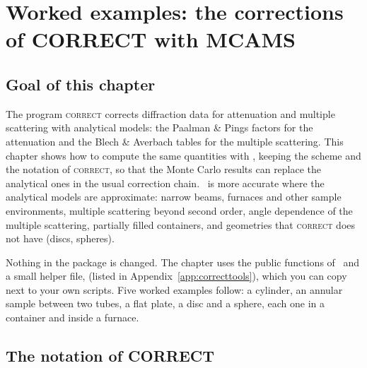 \chapter{Worked examples: the corrections of CORRECT with MCAMS}
\label{ch:correct}

\section{Goal of this chapter}

The program \textsc{correct} corrects diffraction data for attenuation and multiple scattering with analytical models: the
Paalman \& Pings factors for the attenuation and the Blech \& Averbach tables for the multiple scattering. This chapter shows how to
compute the same quantities with \mcams, keeping the scheme and the notation of \textsc{correct}, so that the Monte Carlo results can
replace the analytical ones in the usual correction chain. \mcams\ is more accurate where the analytical models are approximate:
narrow beams, furnaces and other sample environments, multiple scattering beyond second order, angle dependence of the multiple
scattering, partially filled containers, and geometries that \textsc{correct} does not have (discs, spheres).

Nothing in the package is changed. The chapter uses the public functions of \mcams\ and a small helper file,
 (listed in Appendix~\ref{app:correcttools}), which you can copy next to your own scripts. Five worked
examples follow: a cylinder, an annular sample between two tubes, a flat plate, a disc and a sphere, each one in a container and inside
a furnace.

\section{The notation of CORRECT}

